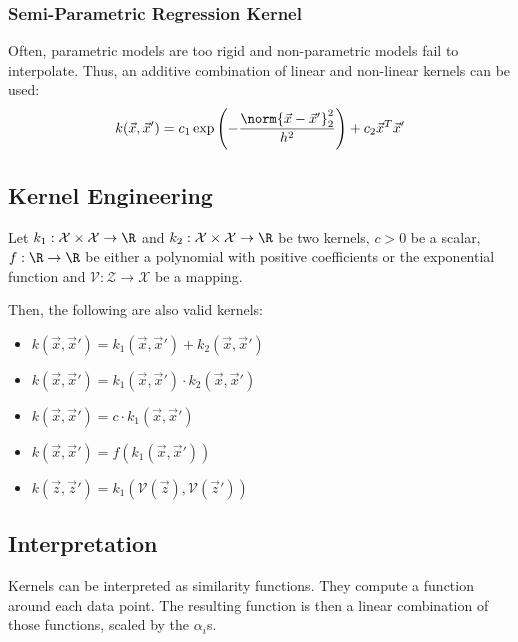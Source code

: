 \subsubsection{Semi-Parametric Regression Kernel}
Often, parametric models are too rigid and non-parametric
models fail to interpolate.
Thus, an additive combination of linear and non-linear
kernels can be used:
\begin{equation*}
k(\vec{x}, \vec{x}') =
c_1 \exp\left(
-\frac{\norm{\vec{x} - \vec{x}'}_2^2}{h^2}
\right) +
c_2 \vec{x}^T \vec{x}'
\end{equation*}


\subsection{Kernel Engineering}
Let $k_1 : \mathcal{X} \times \mathcal{X} \to \R$
and $k_2 : \mathcal{X} \times \mathcal{X} \to \R$
be two kernels,
$c > 0$ be a scalar,
$f : \R \to \R$
be either a polynomial with positive coefficients or the
exponential function and
$\mathcal{V} : \mathcal{Z} \to \mathcal{X}$ be a mapping.

Then, the following are also valid kernels:
\begin{itemize}
	\item $k(\vec{x}, \vec{x}') = k_1(\vec{x}, \vec{x}') + k_2(\vec{x}, \vec{x}')$
	\item $k(\vec{x}, \vec{x}') = k_1(\vec{x}, \vec{x}') \cdot k_2(\vec{x}, \vec{x}')$
	\item $k(\vec{x}, \vec{x}') = c \cdot k_1(\vec{x}, \vec{x}')$
	\item $k(\vec{x}, \vec{x}') = f(k_1(\vec{x}, \vec{x}'))$
	\item $k(\vec{z}, \vec{z}') = k_1(\mathcal{V}(\vec{z}), \mathcal{V}(\vec{z}'))$
\end{itemize}


\subsection{Interpretation}
Kernels can be interpreted as similarity functions.
They compute a function around each data point.
The resulting function is then a linear combination of
those functions, scaled by the $\alpha_i$s.

